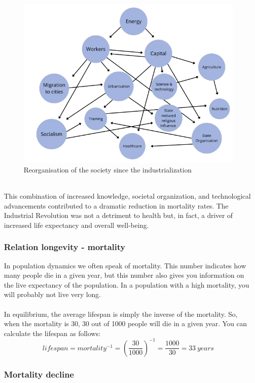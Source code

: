 \documentclass[../summary.tex]{subfiles}
\begin{document}
\begin{figure}[H]
	\centering
	\includegraphics[width=0.7\linewidth]{../images/reorganisation_society}
	\caption{Reorganisation of the society since the industrialization}
	\label{fig:reorganisationsociety}
\end{figure}
\ \\
This combination of increased knowledge, societal organization, and technological advancements contributed to a dramatic reduction in mortality rates. The Industrial Revolution was not a detriment to health but, in fact, a driver of increased life expectancy and overall well-being.

\subsubsection{Relation longevity - mortality}

In population dynamics we often speak of mortality. This number indicates how many people die in a given year, but this number also gives you information on the live expectancy of the population. In a population with a high mortality, you will probably not live very long.\\
\\
In equilibrium, the average lifespan is simply the inverse of the mortality. So, when the mortality is 30\textperthousand, 30 out of 1000 people will die in a given year.  You can calculate the lifespan as follows:\\
\[lifespan = mortality^{-1} = \left(\frac{30}{1000}\right)^{-1} = \frac{1000}{30} = 33\ years\] 
\newpage
\subsubsection{Mortality decline}
\end{document}
